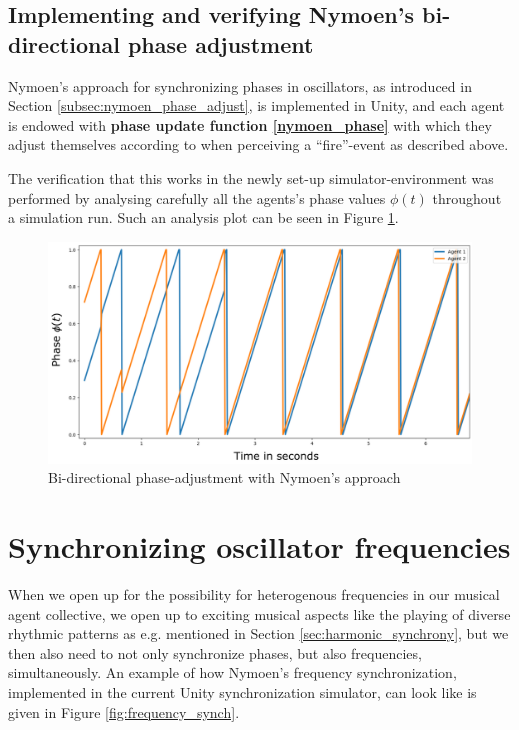 		
		\subsection{Implementing and verifying Nymoen's bi-directional phase adjustment} %
		
		Nymoen's approach for synchronizing phases in oscillators, as introduced in Section \ref{subsec:nymoen_phase_adjust}, is implemented in Unity, and each agent is endowed with \textbf{phase update function \eqref{nymoen_phase}} with which they adjust themselves according to when perceiving a ``fire''-event as described above.
		
		The verification that this works in the newly set-up simulator-environment was performed by analysing carefully all the agents's phase values $\phi(t)$ throughout a simulation run. Such an analysis plot can be seen in Figure \ref{fig:nymoen_phase}.
		
		\begin{figure}[h]
			\centering
			\includegraphics[width=0.9\linewidth]{Assets/DocSegments/Chapters/ExperimentsAndResults/Figures/Validations/KNymoenPhaseAdjustmentSecondTry.pdf}
			\caption[Illustration of Nymoen's bi-directional phase adjustment ($Adj_{\phi}$) method.]{Bi-directional phase-adjustment with Nymoen's approach}
			\label{fig:nymoen_phase}
		\end{figure}	
	
	
\section{Synchronizing oscillator frequencies}
\label{sec:frequency_methods}

	When we open up for the possibility for heterogenous frequencies in our musical agent collective, we open up to exciting musical aspects like the playing of diverse rhythmic patterns as e.g. mentioned in Section \ref{sec:harmonic_synchrony}, but we then also need to not only synchronize phases, but also frequencies, simultaneously. An example of how Nymoen's frequency synchronization, implemented in the current Unity synchronization simulator, can look like is given in Figure \ref{fig:frequency_synch}.
	

